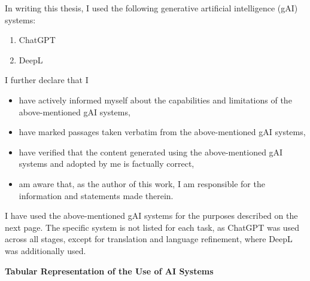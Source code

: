 \newpage
\thispagestyle{empty}

\vspace{1cm}
\noindent In writing this thesis, I used the following generative artificial intelligence (gAI) systems:

\begin{enumerate}
    \item ChatGPT
    \item DeepL
\end{enumerate}
I further declare that I

\begin{itemize}
    \item have actively informed myself about the capabilities and limitations of the above-mentioned gAI systems,
    \item have marked passages taken verbatim from the above-mentioned gAI systems,
    \item have verified that the content generated using the above-mentioned gAI systems and adopted by me is factually correct,
    \item am aware that, as the author of this work, I am responsible for the information and statements made therein.
\end{itemize}
I have used the above-mentioned gAI systems for the purposes described on the next page. The specific system is not listed for each task, as ChatGPT was used across all stages, except for translation and language refinement, where DeepL was additionally used.

\newpage
\thispagestyle{empty}
\noindent\textbf{Tabular Representation of the Use of AI Systems}

\vspace{0.4cm}

